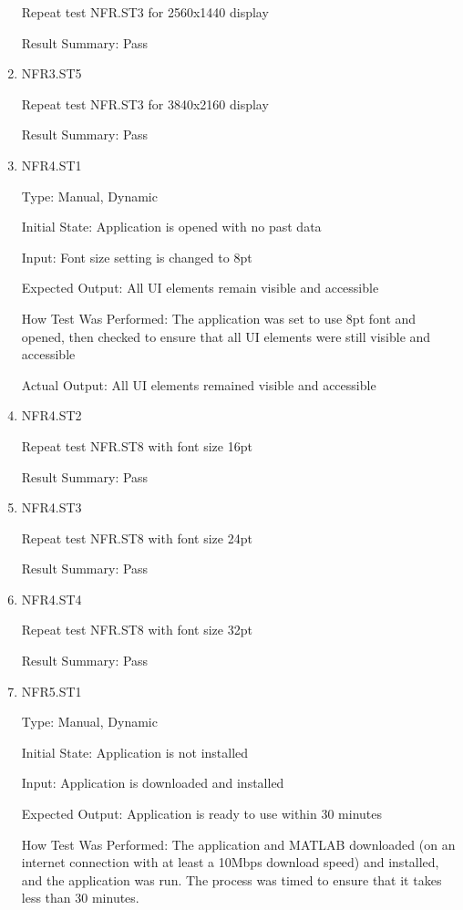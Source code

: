 \documentclass[12pt, titlepage]{article}
\begin{document}
\begin{enumerate}
Repeat test NFR.ST3 for 2560x1440 display

Result Summary: Pass

\item{NFR3.ST5\\}

Repeat test NFR.ST3 for 3840x2160 display

Result Summary: Pass

\item{NFR4.ST1\\}

Type: Manual, Dynamic

Initial State: Application is opened with no past data

Input: Font size setting is changed to 8pt

Expected Output: All UI elements remain visible and accessible

How Test Was Performed: The application was set to use 8pt font and opened, then checked to ensure that all UI elements were still visible and accessible

Actual Output: All UI elements remained visible and accessible

\item{NFR4.ST2\\}

Repeat test NFR.ST8 with font size 16pt

Result Summary: Pass

\item{NFR4.ST3\\}

Repeat test NFR.ST8 with font size 24pt

Result Summary: Pass

\item{NFR4.ST4\\}

Repeat test NFR.ST8 with font size 32pt

Result Summary: Pass

\item{NFR5.ST1\\}

Type: Manual, Dynamic

Initial State: Application is not installed

Input: Application is downloaded and installed

Expected Output: Application is ready to use within 30 minutes

How Test Was Performed: The application and MATLAB downloaded (on an internet connection with at least a 10Mbps download speed) and installed, and the application was run. The process was timed to ensure that it takes less than 30 minutes.


\end{enumerate}
\end{document}
